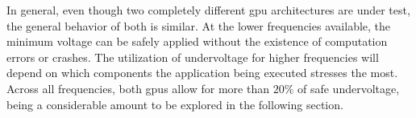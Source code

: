 In general, even though two completely different \acrshort{gpu} architectures are under test, the general behavior of both is similar. At the lower frequencies available, the minimum voltage can be safely applied without the existence of computation errors or crashes. The utilization of undervoltage for higher frequencies will depend on which components the application being executed stresses the most. Across all frequencies, both \acrshort{gpu}s allow for more than $20\%$ of safe undervoltage, being a considerable amount to be explored in the following section.




